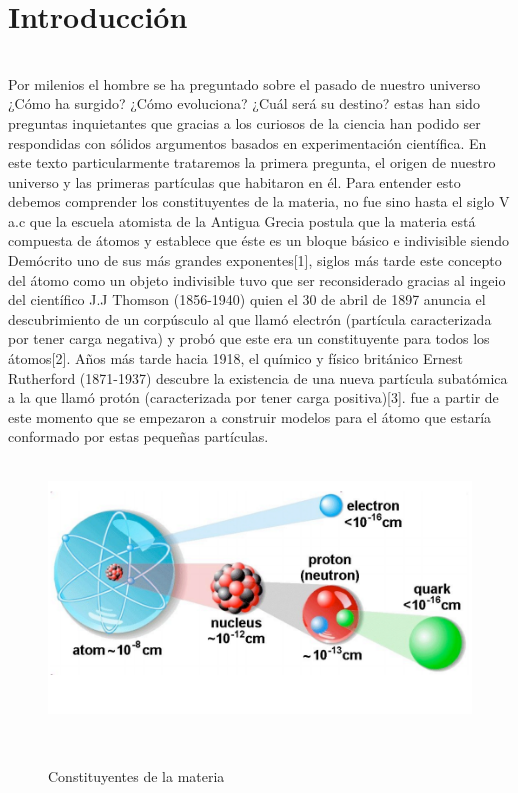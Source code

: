 \documentclass[%
 reprint,
 amsmath,amssymb,
 aps,
]{revtex4-2}
\begin{document}
\section{\label{sec:level1}Introducción }
\\
Por milenios el hombre se ha preguntado sobre el pasado de nuestro universo ¿Cómo ha surgido? ¿Cómo evoluciona? ¿Cuál será su destino? estas han sido preguntas inquietantes que gracias a los curiosos de la ciencia han podido ser respondidas con sólidos argumentos basados en experimentación científica. En este texto particularmente trataremos la primera pregunta, el origen de nuestro universo y las primeras partículas que habitaron en él. Para entender esto debemos comprender los constituyentes de la materia, no fue sino hasta el siglo V a.c que la escuela atomista de la Antigua Grecia postula que la materia está compuesta de átomos y establece que éste es un bloque básico e indivisible siendo Demócrito uno de sus más grandes exponentes[1], siglos más tarde este concepto del átomo como un objeto indivisible tuvo que ser reconsiderado gracias al ingeio del científico J.J Thomson (1856-1940) quien el 30 de abril de 1897 anuncia el descubrimiento de un corpúsculo al que llamó electrón (partícula caracterizada por tener carga negativa) y probó que este era un constituyente para todos los átomos[2]. Años más tarde hacia  1918, el químico y físico británico Ernest Rutherford (1871-1937) descubre la existencia de una nueva partícula subatómica a la que llamó protón (caracterizada por tener carga positiva)[3]. fue a partir de este momento que se empezaron a construir modelos para el átomo que estaría conformado por estas pequeñas partículas. \\
\\
\begin{figure}[H]
\begin{center}
\includegraphics[scale=0.2]{Constituyentes de la materia.png}
\caption{Constituyentes de la materia}\\
\centering
\end{center}
\end{figure}
\end{document}
